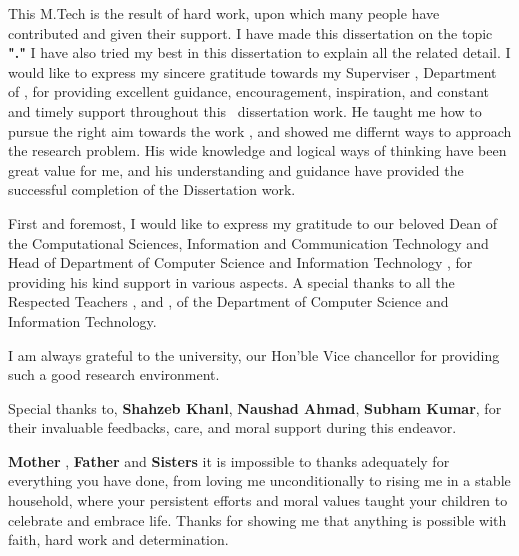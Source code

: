 
\begin{acknowledgements}
\addchaptertocentry{\acknowledgementname} %
\vspace*{2cm}
This M.Tech \rType is the result of hard work, upon which many people have contributed and given their support. I
have made this dissertation on the topic \textbf{"\ReportTitel ."} I have also tried my best in this dissertation to
explain all the related detail. I would like to express my sincere gratitude towards my Superviser \textbf{
	\Supervisor}, Department of \depS, for providing excellent guidance, encouragement, inspiration, and constant and
timely support throughout this \DegreeS \  dissertation work. He taught me how to pursue the right aim towards the work
, and showed me differnt ways to approach the research problem. His wide knowledge and logical ways of thinking have
been great value for me, and his understanding and guidance have provided the successful completion of the
Dissertation work.

First and foremost, I would like to express my gratitude to our beloved Dean of the Computational Sciences,
Information and Communication Technology and Head of Department of Computer Science and Information Technology \textbf{\HodName},
for providing his kind support in various aspects. A special thanks to all the Respected Teachers
\textbf{\Facone}, and \textbf{\Factwo}, of the Department of Computer Science and Information
Technology.

I am always grateful to the university, our Hon’ble Vice chancellor \textbf{\Vc} for providing
such a good research environment.

	Special thanks to, \textbf{Shahzeb Khanl}, \textbf{Naushad Ahmad}, \textbf{Subham Kumar},
for their invaluable feedbacks, care, and moral support during this endeavor.

	\textbf{Mother} , \textbf{Father} and \textbf{Sisters} it is impossible to thanks adequately for everything you have done, from
loving me unconditionally to rising me in a stable household, where your persistent efforts and moral values
taught your children to celebrate and embrace life. Thanks for showing me that anything is possible with faith, hard work and determination. 



\end{acknowledgements}
